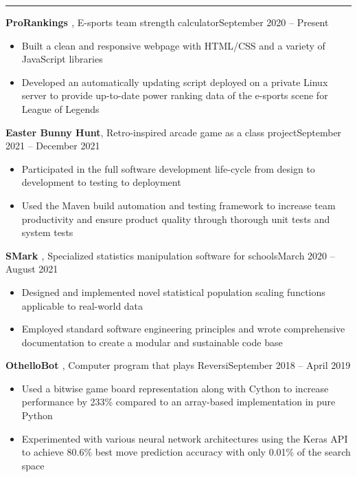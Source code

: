 \documentclass{article}
\newcommand{\entrytitle}[3]{\vspace{0.5em}\textbf{#1}, {\small #2}\hfill #3}
\renewcommand{\section}[1]{\vspace{1em}{\Large #1}\vspace{0.3em}\hrule}
\newenvironment{entrybody}{\begin{itemize}[itemsep=0.3em]}{\end{itemize}}
\begin{document}
\section{Projects}

\entrytitle{ProRankings \href{https://github.com/xtevenx/ProRankings}{\faGithub}} %
    {E-sports team strength calculator}{September 2020 – Present}
\begin{entrybody}
\item Built a clean and responsive webpage with HTML/CSS and a variety of JavaScript libraries
\item
    Developed an automatically updating script deployed on a private Linux server to provide
    up-to-date power ranking data of the e-sports scene for League of Legends
\end{entrybody}

\entrytitle{Easter Bunny Hunt} %
    {Retro-inspired arcade game as a class project}{September 2021 – December 2021}
\begin{entrybody}
\item
    Participated in the full software development life-cycle from design to development to
    testing to deployment
\item
    Used the Maven build automation and testing framework to increase team productivity and
    ensure product quality through thorough unit tests and system tests
\end{entrybody}

\entrytitle{SMark \href{https://github.com/xtevenx/SMark}{\faGithub}} %
    {Specialized statistics manipulation software for schools}{March 2020 – August 2021}
\begin{entrybody}
\item
    Designed and implemented novel statistical population scaling functions applicable to
    real-world data
\item
    Employed standard software engineering principles and wrote comprehensive documentation to
    create a modular and sustainable code base
\end{entrybody}

\entrytitle{OthelloBot \href{https://github.com/xtevenx/othello-bot}{\faGithub}} %
    {Computer program that plays Reversi}{September 2018 – April 2019}
\begin{entrybody}
\item  %
    Used a bitwise game board representation along with Cython to increase performance by 233\%
    compared to an array-based implementation in pure Python
\item  %
    Experimented with various neural network architectures using the Keras API to achieve 80.6\%
    best move prediction accuracy with only 0.01\% of the search space
\end{entrybody}
\end{document}
